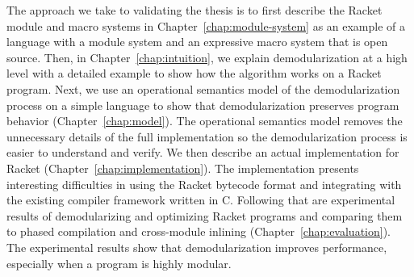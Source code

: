 The approach we take to validating the thesis is to first describe the Racket module and macro systems in Chapter~\ref{chap:module-system} as an example of a language with a module system and an expressive macro system that is open source.
Then, in Chapter~\ref{chap:intuition}, we explain demodularization at a high level with a detailed example to show how the algorithm works on a Racket program.
Next, we use an operational semantics model of the demodularization process on a simple language to show that demodularization preserves program behavior (Chapter~\ref{chap:model}).
The operational semantics model removes the unnecessary details of the full implementation so the demodularization process is easier to understand and verify. 
We then describe an actual implementation for Racket (Chapter~\ref{chap:implementation}).
The implementation presents interesting difficulties in using the Racket bytecode format and integrating with the existing compiler framework written in C.  
Following that are experimental results of demodularizing and optimizing Racket programs and comparing them to phased compilation and cross-module inlining (Chapter~\ref{chap:evaluation}). 
The experimental results show that demodularization improves performance, especially when a program is highly modular. 
